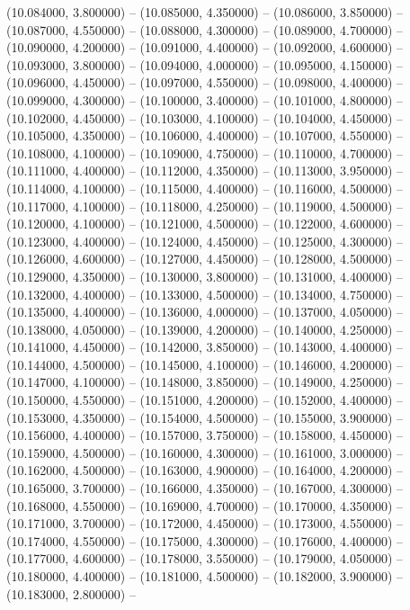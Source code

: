 (10.084000, 3.800000) -- 
(10.085000, 4.350000) -- 
(10.086000, 3.850000) -- 
(10.087000, 4.550000) -- 
(10.088000, 4.300000) -- 
(10.089000, 4.700000) -- 
(10.090000, 4.200000) -- 
(10.091000, 4.400000) -- 
(10.092000, 4.600000) -- 
(10.093000, 3.800000) -- 
(10.094000, 4.000000) -- 
(10.095000, 4.150000) -- 
(10.096000, 4.450000) -- 
(10.097000, 4.550000) -- 
(10.098000, 4.400000) -- 
(10.099000, 4.300000) -- 
(10.100000, 3.400000) -- 
(10.101000, 4.800000) -- 
(10.102000, 4.450000) -- 
(10.103000, 4.100000) -- 
(10.104000, 4.450000) -- 
(10.105000, 4.350000) -- 
(10.106000, 4.400000) -- 
(10.107000, 4.550000) -- 
(10.108000, 4.100000) -- 
(10.109000, 4.750000) -- 
(10.110000, 4.700000) -- 
(10.111000, 4.400000) -- 
(10.112000, 4.350000) -- 
(10.113000, 3.950000) -- 
(10.114000, 4.100000) -- 
(10.115000, 4.400000) -- 
(10.116000, 4.500000) -- 
(10.117000, 4.100000) -- 
(10.118000, 4.250000) -- 
(10.119000, 4.500000) -- 
(10.120000, 4.100000) -- 
(10.121000, 4.500000) -- 
(10.122000, 4.600000) -- 
(10.123000, 4.400000) -- 
(10.124000, 4.450000) -- 
(10.125000, 4.300000) -- 
(10.126000, 4.600000) -- 
(10.127000, 4.450000) -- 
(10.128000, 4.500000) -- 
(10.129000, 4.350000) -- 
(10.130000, 3.800000) -- 
(10.131000, 4.400000) -- 
(10.132000, 4.400000) -- 
(10.133000, 4.500000) -- 
(10.134000, 4.750000) -- 
(10.135000, 4.400000) -- 
(10.136000, 4.000000) -- 
(10.137000, 4.050000) -- 
(10.138000, 4.050000) -- 
(10.139000, 4.200000) -- 
(10.140000, 4.250000) -- 
(10.141000, 4.450000) -- 
(10.142000, 3.850000) -- 
(10.143000, 4.400000) -- 
(10.144000, 4.500000) -- 
(10.145000, 4.100000) -- 
(10.146000, 4.200000) -- 
(10.147000, 4.100000) -- 
(10.148000, 3.850000) -- 
(10.149000, 4.250000) -- 
(10.150000, 4.550000) -- 
(10.151000, 4.200000) -- 
(10.152000, 4.400000) -- 
(10.153000, 4.350000) -- 
(10.154000, 4.500000) -- 
(10.155000, 3.900000) -- 
(10.156000, 4.400000) -- 
(10.157000, 3.750000) -- 
(10.158000, 4.450000) -- 
(10.159000, 4.500000) -- 
(10.160000, 4.300000) -- 
(10.161000, 3.000000) -- 
(10.162000, 4.500000) -- 
(10.163000, 4.900000) -- 
(10.164000, 4.200000) -- 
(10.165000, 3.700000) -- 
(10.166000, 4.350000) -- 
(10.167000, 4.300000) -- 
(10.168000, 4.550000) -- 
(10.169000, 4.700000) -- 
(10.170000, 4.350000) -- 
(10.171000, 3.700000) -- 
(10.172000, 4.450000) -- 
(10.173000, 4.550000) -- 
(10.174000, 4.550000) -- 
(10.175000, 4.300000) -- 
(10.176000, 4.400000) -- 
(10.177000, 4.600000) -- 
(10.178000, 3.550000) -- 
(10.179000, 4.050000) -- 
(10.180000, 4.400000) -- 
(10.181000, 4.500000) -- 
(10.182000, 3.900000) -- 
(10.183000, 2.800000) -- 
